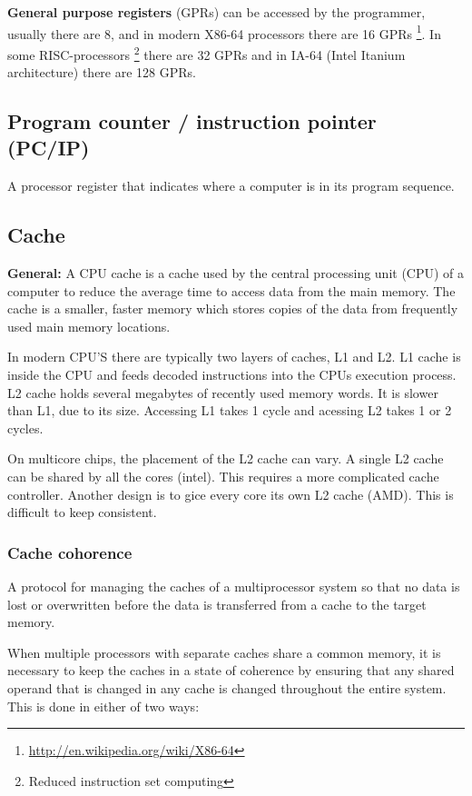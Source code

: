 \documentclass{article}
\begin{document}
\textbf{General purpose registers} (GPRs) can be accessed by the programmer, usually there are 8, and in modern X86-64 processors there are 16 GPRs \footnote{\url{http://en.wikipedia.org/wiki/X86-64}}. In some RISC-processors \footnote{Reduced instruction set computing} there are 32 GPRs and in IA-64 (Intel Itanium architecture) there are 128 GPRs.


\subsection{Program counter / instruction pointer (PC/IP)}
A processor register that indicates where a computer is in its program sequence.

\subsection{Cache}
{\bf General:} A CPU cache is a cache used by the central processing unit (CPU) of a computer to reduce the average time to access data from the main memory. The cache is a smaller, faster memory which stores copies of the data from frequently used main memory locations.

In modern CPU'S there are typically two layers of caches, L1 and L2. L1 cache is inside the CPU and feeds decoded instructions into the CPUs execution process. L2 cache holds several megabytes of recently used memory words. It is slower than L1, due to its size. Accessing L1 takes 1 cycle and acessing L2 takes 1 or 2 cycles.

On multicore chips, the placement of the L2 cache can vary. A single L2 cache can be shared by all the cores (intel).  This requires a more complicated cache controller. Another design is to gice every core  its own L2 cache (AMD). This is difficult to keep consistent.

\subsubsection{Cache cohorence}
A protocol for managing the caches of a multiprocessor system so that no data is lost or overwritten before the data is transferred from a cache to the target memory.


When multiple processors with separate caches share a common memory, it is necessary to keep the caches in a state of coherence by ensuring that any shared operand that is changed in any cache is changed throughout the entire system. This is done in either of two ways:
\end{document}
